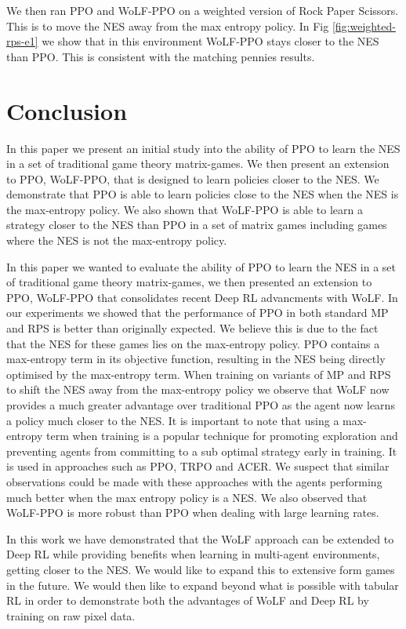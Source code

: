 \documentclass[conference]{IEEEtran}
\begin{document}
We then ran PPO and WoLF-PPO on a weighted version of Rock Paper Scissors. This is to move the NES away from the max entropy policy. In Fig \ref{fig:weighted-rps-e1} we show that in this environment WoLF-PPO stays closer to the NES than PPO. This is consistent with the matching pennies results.

\section{Conclusion}


In this paper we present an initial study into the ability of PPO to learn the NES in a set of traditional game theory matrix-games. We then present an extension to PPO, WoLF-PPO, that is designed to learn policies closer to the NES. We demonstrate that PPO is able to learn policies close to the NES when the NES is the max-entropy policy. We also shown that WoLF-PPO is able to learn a strategy closer to the NES than PPO in a set of matrix games including games where the NES is not the max-entropy policy.

In this paper we wanted to evaluate the ability of PPO to learn the NES in a set of traditional game theory matrix-games, we then presented an extension to PPO, WoLF-PPO that consolidates recent Deep RL advancments with WoLF. In our experiments we showed that the performance of PPO in both standard MP and RPS is better than originally expected. We believe this is due to the fact that the NES for these games lies on the max-entropy policy. PPO contains a max-entropy term in its objective function, resulting in the NES being directly optimised by the max-entropy term. When training on variants of MP and RPS to shift the NES away from the max-entropy policy we observe that WoLF now provides a much greater advantage over traditional PPO as the agent now learns a policy much closer to the NES. It is important to note that using a max-entropy term when training is a popular technique for promoting exploration and preventing agents from committing to a sub optimal strategy early in training. It is used in approaches such as PPO\cite{schulman2017proximal}, TRPO\cite{schulman2015trust} and ACER\cite{Wang2017SampleEA}. We suspect that similar observations could be made with these approaches with the agents performing much better when the max entropy policy is a NES. We also observed that WoLF-PPO is more robust than PPO when dealing with large learning rates.

In this work we have demonstrated that the WoLF approach can be extended to Deep RL while providing benefits when learning in multi-agent environments, getting closer to the NES. We would like to expand this to extensive form games in the future. We would then like to expand beyond what is possible with tabular RL in order to demonstrate both the advantages of WoLF and Deep RL by training on raw pixel data.



\end{document}
